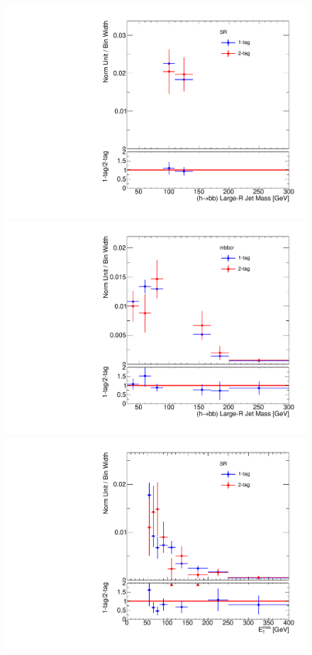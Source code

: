 \begin{figure}[!htbp]
\begin{center}
\includegraphics[scale=0.33]{./figures/boosted/ABCD/ABCD_2TagVs1Tag_SR_lepton_HbbMass}    
\includegraphics[scale=0.33]{./figures/boosted/ABCD/ABCD_2TagVs1Tag_mbbcr_lepton_HbbMass}\\
\includegraphics[scale=0.33]{./figures/boosted/ABCD/ABCD_2TagVs1Tag_SR_lepton_MET}   

\end{center}
\end{figure}
